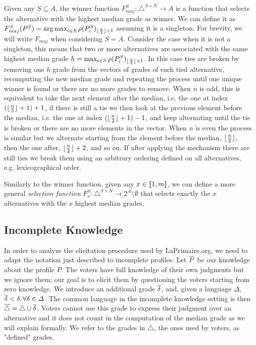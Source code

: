 \documentclass[version=3.21, pagesize, twoside=off, bibliography=totoc, DIV=calc, fontsize=12pt, a4paper]{scrartcl}
\begin{document}
Given any $S\subseteq A$, the winner function $F^S_{maj}:\triangle^{S \times N} \rightarrow A$ %
is a function that selects the alternative with the highest median grade as winner. We can define it as $F^S_{maj}(P^S) = \operatorname*{arg\,max}_{i\in S}\rho(P^S_i)_{\lfloor\frac{n}{2}\rfloor+ 1}$ assuming it is a singleton. For brevity, we will write $F_{maj}$ when considering $S=A$. Consider the case when it is not a singleton, this means that two or more alternatives are associated with the same highest median grade $h=\max_{i\in S}\rho(P^S_i)_{\lfloor\frac{n}{2}\rfloor + 1}$. In this case ties are broken by removing one $h$ grade from the vectors of grades of each tied alternative, recomputing the new median grade and repeating the process until one unique winner is found or there are no more grades to remove. When $n$ is odd, this is equivalent to take the next element after the median, i.e. the one at index $(\lfloor\frac{n}{2}\rfloor + 1) +1$, if there is still a tie we then look at the previous element before the median, i.e. the one at index $(\lfloor\frac{n}{2}\rfloor + 1) -1$, and keep alternating until the tie is broken or there are no more elements in the vector. When $n$ is even the process is similar but we alternate starting from the element before the median, $\lfloor\frac{n}{2}\rfloor$, then the one after, $\lfloor\frac{n}{2}\rfloor + 2$, and so on.  If after applying the mechanism there are still ties we break them using an arbitrary ordering defined on all alternatives, e.g. lexicographical order.

Similarly to the winner function, given any $x \in \llbracket1,m\rrbracket$, we can define a more general \emph{selection function} $F^S_x:\triangle^{S\times N} \rightarrow 2^A \setminus \emptyset$ that selects exactly the $x$ alternatives with the $x$ highest median grades.

\subsection{Incomplete Knowledge}
In order to analyze the elicitation procedure used by LaPrimaire.org, we need to adapt the notation just described to incomplete profiles. 
 Let $\overline{P}$ be our knowledge about the profile $P$.
The voters have full knowledge of their own judgments but we ignore them; our goal is to elicit them by questioning the voters starting from zero knowledge.
We introduce an additional grade $\overline{\delta}$, and, given a language $\Delta$, $\overline{\delta}< \delta, \forall \delta \in \Delta$.  The common language in the incomplete knowledge setting is then $\overline{\triangle}=\triangle \cup \overline{\delta}$. Voters cannot use this grade to express their judgment over an alternative and it does not count in the computation of the median grade as we will explain formally. We refer to the grades in $\triangle$, the ones used by voters, as "defined" grades.
\end{document}
